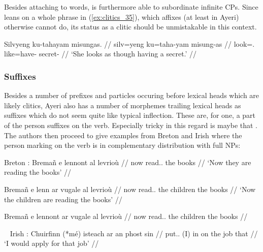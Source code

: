 Besides attaching to words,  is furthermore able to subordinate
infinite CPs. Since  leans on a whole phrase in 
(\ref{ex:clitics_35}), which affixes (at least in Ayeri) otherwise cannot do,
its status as a clitic should be unmistakable in this context.

\ex\label{ex:clitics_36}\begingl
	\gla Silvyeng ku-tahayam misungas. //
	\glb silv=yeng ku=taha-yam misung-as //
	\glc look=\TsgF{}.\Aarg{} like=have-\Ptcp{} secret-\Parg{} //
	\glft `She looks as though having a secret.' //
\endgl\xe

\subsubsection{Suffixes}
\label{subsubsec:suffixes}

Besides a number of prefixes and particles occuring before lexical heads which
are likely clitics, Ayeri also has a number of morphemes trailing lexical heads
as suffixes which do not seem quite like typical inflection. These are, for
one, a part of the person suffixes on the verb. Especially tricky in this
regard is maybe that . The authors then
proceed to give examples from Breton and Irish where the person marking on the verb is in complementary distribution with full NPs:

\pex\label{ex:clitics_37}
Breton \parencites[145]{spencerluis2012}[from][]{borsleyetal2007}:
\a\label{ex:clitics_37a}
\begingl
	\gla Bremañ e lennont al levrioù //
	\glb now \Prt{} read.\Prs{}.\Tpl{} the books //
	\glft `Now they are reading the books' //
\endgl

\a\label{ex:clitics_37b}\begingl
	\gla Bremañ e lenn ar vugale al levrioù //
	\glb now \Prt{} read.\Prs{}.\Tsg{} the children the books //
	\glft `Now the children are reading the books' //
\endgl

\a\label{ex:clitics_37c}\ljudge{*}\begingl
	\gla Bremañ e lennont ar vugale al levrioù //
	\glb now \Prt{} read.\Prs{}.\Tpl{} the children the books //
\endgl
\xe

\pex~\label{ex:clitics_38}
Irish \parencites[145]{spencerluis2012}[from][]{mccloskeyhale1984}:
\a\label{ex:clitics_38a}
\begingl
	\gla Chuirfinn (*mé) isteach ar an phost sin //
	\glb put.\Cond{}.\Fsg{} (​I​) in on the job that //
	\glft `I would apply for that job' //
\endgl


